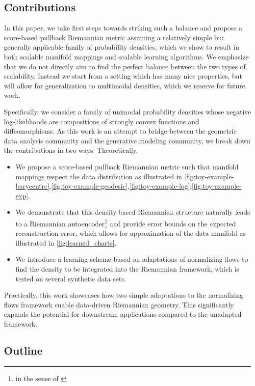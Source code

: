\subsection{Contributions}

In this paper, we take first steps towards striking such a balance and propose a score-based pullback Riemannian metric assuming a relatively simple but generally applicable family of probability densities, which we show to result in both scalable manifold mappings and scalable learning algorithms. We emphasize that we do not directly aim to find the perfect balance between the two types of scalability. Instead we start from a setting which has many nice properties, but will allow for generalization to multimodal densities, which we reserve for future work.

Specifically, we consider a family of unimodal probability densities whose negative log-likelihoods are compositions of strongly convex functions and diffeomorphisms. As this work is an attempt to bridge between the geometric data analysis community and the generative modeling community, we break down the contributions in two ways.
Theoretically,
\begin{itemize}
    \item We propose a score-based pullback Riemannian metric such that manifold mappings respect the data distribution as illustrated in \ref{fig:toy-example-barycentre},\ref{fig:toy-example-geodesic},\ref{fig:toy-example-log},\ref{fig:toy-example-exp}.
    \item We demonstrate that this density-based Riemannian structure naturally leads to a Riemannian autoencoder\footnote{in the sense of \cite{diepeveen2024pulling}} and provide error bounds on the expected reconstruction error, which allows for approximation of the data manifold as illustrated in \ref{fig:learned_charts}.
    \item We introduce a learning scheme based on adaptations of normalizing flows to find the density to be integrated into the Riemannian framework, which is tested on several synthetic data sets. 
\end{itemize}
Practically, this work showcases how two simple adaptations to the normalizing flows framework enable data-driven Riemannian geometry. This significantly expands the potential for downstream applications compared to the unadapted framework.

\subsection{Outline}

